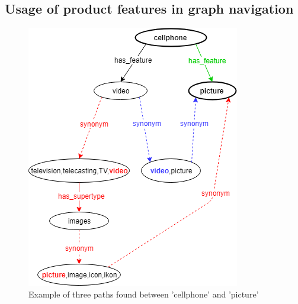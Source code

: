 \documentclass{beamer}
\begin{document}
\subsection{Usage of product features in graph navigation}
\begin{frame}
    \begin{figure}[H]
        \centering
        \includegraphics[scale=0.5]{cellphone_navigation.png}
        \caption{Example of three paths found between 'cellphone' and 'picture'}
        \label{fig:cellphone-example}
    \end{figure}
\end{frame}
\end{document}
